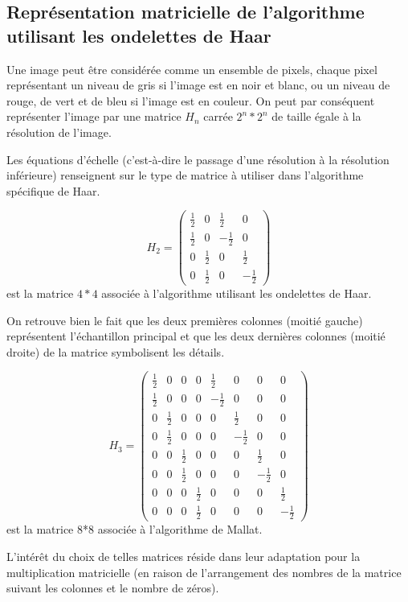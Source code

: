 \documentclass{article}
\begin{document}
\subsection{Représentation matricielle de l’algorithme utilisant les ondelettes de Haar}

Une image peut être considérée comme un ensemble de pixels, chaque pixel représentant un niveau de gris si l’image est en noir et blanc, ou un niveau de rouge, de vert et de bleu si l’image est en couleur. On peut par conséquent représenter l’image par une matrice $H_n$  carrée $2^n*2^n$ de taille égale à la résolution de l’image.

Les équations d’échelle (c’est-à-dire le passage d’une résolution à la résolution inférieure) renseignent sur le type de matrice à utiliser dans l’algorithme spécifique de Haar.


\[H_2 = \begin{pmatrix}
\frac{1}{2} & 0 & \frac{1}{2} & 0 \\
\frac{1}{2} & 0 & -\frac{1}{2} & 0 \\
0 & \frac{1}{2} & 0 & \frac{1}{2} \\
0 & \frac{1}{2} & 0 & -\frac{1}{2}
\end{pmatrix}
\] est la matrice $4*4$ associée à l’algorithme utilisant les ondelettes de Haar.

On retrouve bien le fait que les deux premières colonnes (moitié gauche) représentent l’échantillon principal et que les deux dernières colonnes (moitié droite) de la matrice symbolisent les détails.

\[H_3 = \begin{pmatrix}
\frac{1}{2} & 0 & 0 & 0 & \frac{1}{2} & 0 & 0 & 0 \\
\frac{1}{2} & 0 & 0 & 0 & -\frac{1}{2} & 0 & 0 & 0\\
0 & \frac{1}{2} & 0 & 0 & 0 & \frac{1}{2} &0 & 0 \\
0 & \frac{1}{2} & 0 & 0 & 0 & -\frac{1}{2} & 0 & 0 \\
0 & 0 & \frac{1}{2} & 0 & 0 & 0 & \frac{1}{2} & 0 \\ 
0 & 0 & \frac{1}{2} & 0 & 0 & 0 & -\frac{1}{2} & 0 \\ 
0 & 0 & 0 & \frac{1}{2} & 0 & 0 & 0 & \frac{1}{2} \\ 
0 & 0 & 0 & \frac{1}{2} & 0 & 0 & 0 & -\frac{1}{2} 
\end{pmatrix}
\] est la matrice 8*8 associée à l'algorithme de Mallat.


L’intérêt du choix de telles matrices réside dans leur adaptation pour la multiplication matricielle (en raison de l’arrangement des nombres de la matrice suivant les colonnes et le nombre de zéros).
\end{document}
